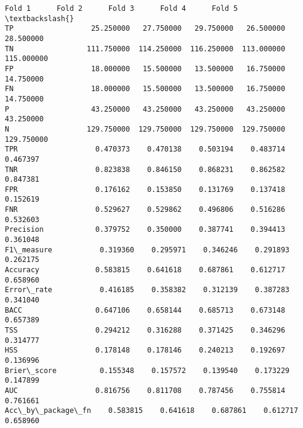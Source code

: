 \documentclass[11pt]{article}
\makeatletter
\newcommand{\boxspacing}{\kern\kvtcb@left@rule\kern\kvtcb@boxsep}
\newcommand{\prompt}[4]{
        {\ttfamily\llap{{\color{#2}[#3]:\hspace{3pt}#4}}\vspace{-\baselineskip}}
    }
\makeatother
\begin{document}
            \begin{tcolorbox}[breakable, size=fbox, boxrule=.5pt, pad at break*=1mm, opacityfill=0]
\prompt{Out}{outcolor}{24}{\boxspacing}
\begin{Verbatim}[commandchars=\\\{\}]
                       Fold 1      Fold 2      Fold 3      Fold 4      Fold 5  \textbackslash{}
TP                  25.250000   27.750000   29.750000   26.500000   28.500000
TN                 111.750000  114.250000  116.250000  113.000000  115.000000
FP                  18.000000   15.500000   13.500000   16.750000   14.750000
FN                  18.000000   15.500000   13.500000   16.750000   14.750000
P                   43.250000   43.250000   43.250000   43.250000   43.250000
N                  129.750000  129.750000  129.750000  129.750000  129.750000
TPR                  0.470373    0.470138    0.503194    0.483714    0.467397
TNR                  0.823838    0.846150    0.868231    0.862582    0.847381
FPR                  0.176162    0.153850    0.131769    0.137418    0.152619
FNR                  0.529627    0.529862    0.496806    0.516286    0.532603
Precision            0.379752    0.350000    0.387741    0.394413    0.361048
F1\_measure           0.319360    0.295971    0.346246    0.291893    0.262175
Accuracy             0.583815    0.641618    0.687861    0.612717    0.658960
Error\_rate           0.416185    0.358382    0.312139    0.387283    0.341040
BACC                 0.647106    0.658144    0.685713    0.673148    0.657389
TSS                  0.294212    0.316288    0.371425    0.346296    0.314777
HSS                  0.178148    0.178146    0.240213    0.192697    0.136996
Brier\_score          0.155348    0.157572    0.139540    0.173229    0.147899
AUC                  0.816756    0.811708    0.787456    0.755814    0.761661
Acc\_by\_package\_fn    0.583815    0.641618    0.687861    0.612717    0.658960


\end{Verbatim}
\end{tcolorbox}
\end{document}
